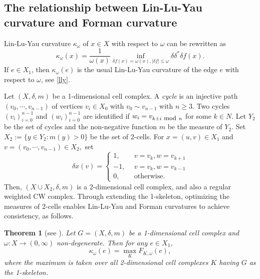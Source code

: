 \documentclass{article}
\newtheorem{theorem}{Theorem}[section]
\newtheorem{corollary}{Corollary}[section]
\begin{document}
\subsection{The relationship between Lin-Lu-Yau curvature and Forman curvature}
Lin-Lu-Yau curvature $\kappa_\omega$ of $x\in X$ with respect to $\omega$ can be rewritten as 
\begin{equation*}\label{ollivier-cell}
\kappa_\omega(x)=\frac{1}{\omega(x)}\inf_{\delta f(x)=\omega(x),|\delta f|\leq \omega}\delta \delta^*\delta f(x).
\end{equation*}
If $e \in X_1$, then $\kappa_\omega(e)$ is the usual Lin-Lu-Yau curvature of the edge $e$ with respect to $\omega$, see \eqref{lly}.



Let $(X,\delta,m)$ be a  1-dimensional cell complex. A {\it cycle} is an injective path $(v_0, \cdots, v_{n-1})$ of vertices $v_i\in X_0$ with $v_0 \sim v_{n-1}$ with $n\geq3$. Two cycles $(v_i)^{n-1}_{i=0}$ and $(w_i)^{n-1}_{i=0}$ are identified if $w_i = v_{k\pm i ~\mbox{\small{mod}}~ n}$ for some $k\in N$. 
Let $Y_2$ be the set of cycles and the non-negative function $m$ be the measure of $Y_2$. Set $X_2:=\{y\in Y_2: m(y)>0\}$ be the set of 2-cells.
For $x=(u,v)\in X_1$ and $v=(v_0, \cdots, v_{n-1})\in X_2,$ set
\[\delta x(v) =\left\{\begin{aligned}
   1,~~ &v=v_k,w=v_{k+1}\\
   -1,~~ &v=v_k,w=v_{k-1}\\
   0,~~ &\mbox{otherwise}.
\end{aligned}
  \right.\]
Then, $(X\cup X_2, \delta, m)$ is a 2-dimensional cell complex, and also a regular weighted CW complex. Through extending the 1-skeleton, optimizing the measures of 2-cells enables Lin-Lu-Yau and Forman curvatures to achieve consistency, as follows.
\begin{theorem}[see \cite{JM21}]\label{th:equi}
Let $G=(X,\delta,m)$ be a 1-dimensional cell complex and $\omega:X\rightarrow(0,\infty)$ non-degenerate. Then for any $e\in X_1$,
\begin{equation*}\label{forman-ollivier}
    \kappa_{\omega}(e)=\max_KF_{K,\omega}(e),
\end{equation*}
where the maximum is taken over all 2-dimensional cell complexes $K$ having $G$ as the 1-skeleton.
\end{theorem}
\end{document}
